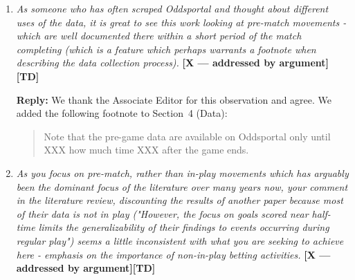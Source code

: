 \documentclass[letterpaper,12pt]{article}
\newcounter{b}
\newcommand{\argX}{\textcolor{green!55!black}{\textbf{[X --- addressed by argument]}}}
\newcommand{\argT}{\textcolor{blue!75!black}{\textbf{[TD]}}}
\newcommand{\Reply}[1]{\par\noindent\textbf{Reply:} #1}
\begin{document}
\begin{enumerate}
\item \textit{As someone who has often scraped Oddsportal and thought about different uses of the data, it is great to see this work looking at pre-match movements - which are well documented there within a short period of the match completing (which is a feature which perhaps warrants a footnote when describing the data collection process). } \argX \argT

\Reply{We thank the Associate Editor for this observation and agree. We added the following footnote to Section~4 (Data):
\begin{quote}
 Note that the pre-game data are available on Oddsportal only until XXX how much time XXX after the game ends.
\end{quote}


}

\item \textit{As you focus on pre-match, rather than in-play movements which has arguably been the dominant focus of the literature over many years now, your comment in the literature review, discounting the results of another paper because most of their data is not in play ("However, the focus on goals scored near half-time limits the generalizability of their findings to events occurring during regular play") seems a little inconsistent with what you are seeking to achieve here - emphasis on the importance of non-in-play betting activities. } \argX \argT


\end{enumerate}
\end{document}
